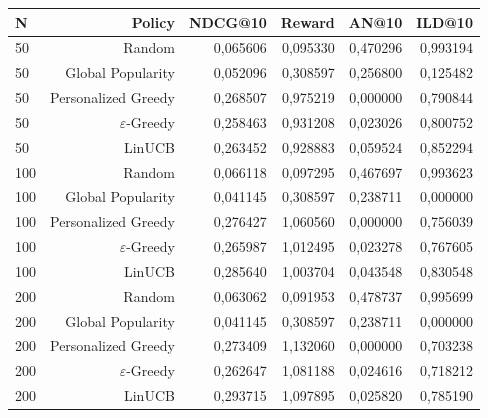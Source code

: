 \begin{tabular}{lrrrrr}
\toprule
N & Policy & NDCG@10 & Reward & AN@10 & ILD@10 \\
\midrule
50 & Random & 0,065606 & 0,095330 & 0,470296 & 0,993194 \\
50 & Global Popularity & 0,052096 & 0,308597 & 0,256800 & 0,125482 \\
50 & Personalized Greedy & 0,268507 & 0,975219 & 0,000000 & 0,790844 \\
50 & $\varepsilon$-Greedy & 0,258463 & 0,931208 & 0,023026 & 0,800752 \\
50 & LinUCB & 0,263452 & 0,928883 & 0,059524 & 0,852294 \\
100 & Random & 0,066118 & 0,097295 & 0,467697 & 0,993623 \\
100 & Global Popularity & 0,041145 & 0,308597 & 0,238711 & 0,000000 \\
100 & Personalized Greedy & 0,276427 & 1,060560 & 0,000000 & 0,756039 \\
100 & $\varepsilon$-Greedy & 0,265987 & 1,012495 & 0,023278 & 0,767605 \\
100 & LinUCB & 0,285640 & 1,003704 & 0,043548 & 0,830548 \\
200 & Random & 0,063062 & 0,091953 & 0,478737 & 0,995699 \\
200 & Global Popularity & 0,041145 & 0,308597 & 0,238711 & 0,000000 \\
200 & Personalized Greedy & 0,273409 & 1,132060 & 0,000000 & 0,703238 \\
200 & $\varepsilon$-Greedy & 0,262647 & 1,081188 & 0,024616 & 0,718212 \\
200 & LinUCB & 0,293715 & 1,097895 & 0,025820 & 0,785190 \\
\bottomrule
\end{tabular}
